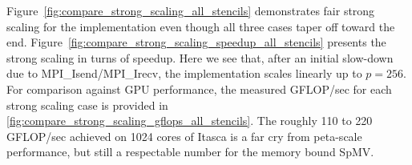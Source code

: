 \documentclass{report}
\begin{document}
Figure~\ref{fig:compare_strong_scaling_all_stencils} demonstrates fair strong scaling for the implementation even though all three cases taper off toward the end. Figure~\ref{fig:compare_strong_scaling_speedup_all_stencils} presents the strong scaling in turns of speedup. Here we see that, after an initial slow-down due to MPI\_Isend/MPI\_Irecv, the implementation scales linearly up to $p=256$. For comparison against GPU performance, the measured GFLOP/sec for each strong scaling case is provided in \ref{fig:compare_strong_scaling_gflops_all_stencils}. The roughly 110 to 220 GFLOP/sec achieved on 1024 cores of Itasca is a far cry from peta-scale performance, but still a respectable number for the memory bound SpMV. 



%
\end{document}
